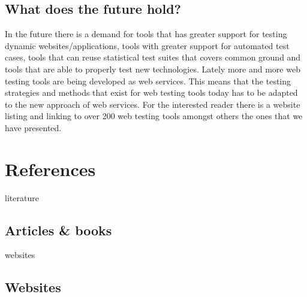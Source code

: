 \documentclass[a4paper, twocolumn]{ieee}
\begin{document}
\subsection{What does the future hold?}

In the future there is a demand for tools that has greater support for testing dynamic websites/applications, tools 
with greater support for automated test cases, tools that can reuse statistical test suites that covers common ground 
and tools that are able to properly test new technologies. Lately more and more web testing tools are being developed
as web services. This means that the testing strategies and methods that exist for web testing tools today has to be 
adapted to the new approach of web services.\cite{dlf07} For the interested reader there is a website listing and linking to over
200 web testing tools amongst others the ones that we have presented. \cite{softqa}


\appendix

\section{References}

\begin{btSect}[plain]{literature}
\subsection{Articles \& books}
\btPrintAll
\end{btSect}

\begin{btSect}[plain]{websites}
\subsection{Websites}
\btPrintAll
\end{btSect}
\end{document}
